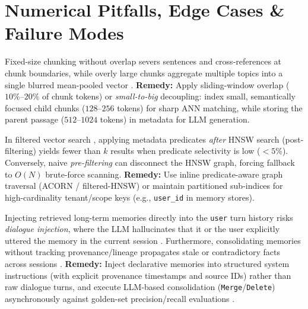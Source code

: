 \documentclass[../../../../master.tex]{subfiles}
\begin{document}
\section{Numerical Pitfalls, Edge Cases \& Failure Modes}
\label{sec:rag:pitfalls}

\begin{pitfall}
Fixed-size chunking without overlap severs sentences and cross-references at chunk boundaries, while overly large chunks aggregate multiple topics into a single blurred mean-pooled vector .
\textbf{Remedy:} Apply sliding-window overlap ($10\%$--$20\%$ of chunk tokens) or \emph{small-to-big} decoupling: index small, semantically focused child chunks ($128$--$256$ tokens) for sharp ANN matching, while storing the parent passage ($512$--$1024$ tokens) in metadata for LLM generation.
\end{pitfall}

\begin{pitfall}
In filtered vector search , applying metadata predicates \emph{after} HNSW search (post-filtering) yields fewer than $k$ results when predicate selectivity is low ($<5\%$). Conversely, naive \emph{pre-filtering} can disconnect the HNSW graph, forcing fallback to $O(N)$ brute-force scanning.
\textbf{Remedy:} Use inline predicate-aware graph traversal (ACORN / filtered-HNSW) or maintain partitioned sub-indices for high-cardinality tenant/scope keys (e.g., \texttt{user\_id} in memory stores).
\end{pitfall}

\begin{pitfall}
Injecting retrieved long-term memories directly into the \texttt{user} turn history risks \emph{dialogue injection}, where the LLM hallucinates that it or the user explicitly uttered the memory in the current session . Furthermore, consolidating memories without tracking provenance/lineage propagates stale or contradictory facts across sessions .
\textbf{Remedy:} Inject declarative memories into structured system instructions (with explicit provenance timestamps and source IDs) rather than raw dialogue turns, and execute LLM-based consolidation (\texttt{Merge}/\texttt{Delete}) asynchronously against golden-set precision/recall evaluations .
\end{pitfall}
\end{document}
